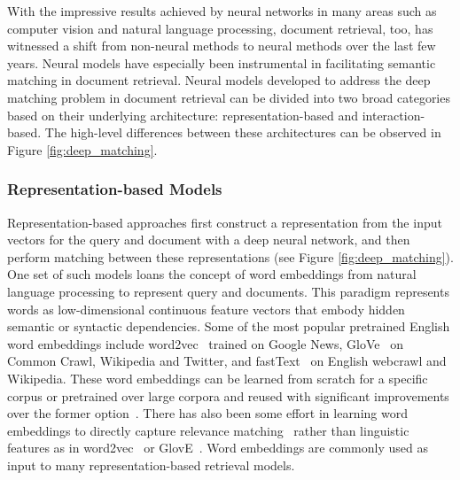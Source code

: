 With the impressive results achieved by neural networks in many areas such as computer vision and natural language processing, document retrieval, too, has witnessed a shift from non-neural methods to neural methods over the last few years.
Neural models have especially been instrumental in facilitating semantic matching in document retrieval.
Neural models developed to address the deep matching problem in document retrieval can be divided into two broad categories based on their underlying architecture: representation-based and interaction-based.
The high-level differences between these architectures can be observed in Figure \ref{fig:deep_matching}.

\subsubsection{Representation-based Models}

Representation-based approaches first construct a representation from the input vectors for the query and document with a deep neural network, and then perform matching between these representations (see  Figure \ref{fig:deep_matching}).
One set of such models loans the concept of word embeddings from natural language processing to represent query and documents.
This paradigm represents words as low-dimensional continuous feature vectors that embody hidden semantic or syntactic dependencies.
Some of the most popular pretrained English word embeddings include word2vec~\cite{mikolov2013distributed} trained on  Google News, GloVe~\cite{pennington2014glove} on Common Crawl, Wikipedia and Twitter, and fastText~\cite{bojanowski2017enriching} on English webcrawl and Wikipedia.
These word embeddings can be learned from scratch for a specific corpus or pretrained over large corpora and reused with significant improvements over the former option~\cite{turian2010word}.
There has also been some effort in learning word embeddings to directly capture relevance matching~\cite{DBLP:journals/corr/ZamaniC17, ganguly2015word} rather than linguistic features as in word2vec~\cite{mikolov2013distributed} or GlovE~\cite{pennington2014glove}.
Word embeddings are commonly used as input to many representation-based retrieval models.

